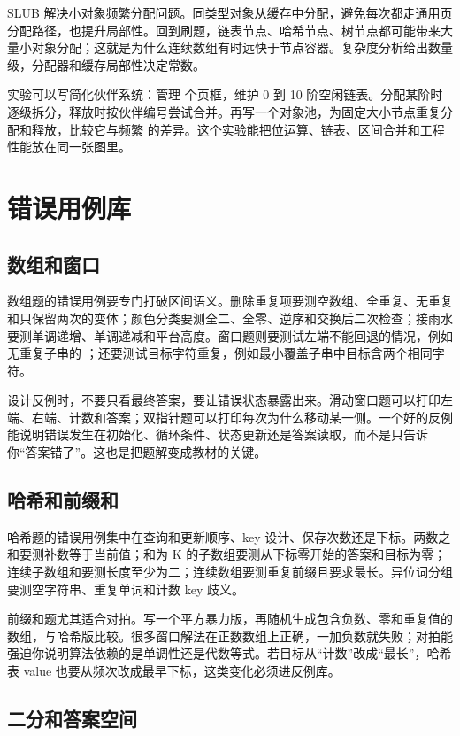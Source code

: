 SLUB 解决小对象频繁分配问题。同类型对象从缓存中分配，避免每次都走通用页分配路径，也提升局部性。回到刷题，链表节点、哈希节点、树节点都可能带来大量小对象分配；这就是为什么连续数组有时远快于节点容器。复杂度分析给出数量级，分配器和缓存局部性决定常数。

实验可以写简化伙伴系统：管理  个页框，维护 0 到 10 阶空闲链表。分配某阶时逐级拆分，释放时按伙伴编号尝试合并。再写一个对象池，为固定大小节点重复分配和释放，比较它与频繁  的差异。这个实验能把位运算、链表、区间合并和工程性能放在同一张图里。

\section{错误用例库}

\subsection{数组和窗口}

数组题的错误用例要专门打破区间语义。删除重复项要测空数组、全重复、无重复和只保留两次的变体；颜色分类要测全二、全零、逆序和交换后二次检查；接雨水要测单调递增、单调递减和平台高度。窗口题则要测试左端不能回退的情况，例如无重复子串的 ；还要测试目标字符重复，例如最小覆盖子串中目标含两个相同字符。

设计反例时，不要只看最终答案，要让错误状态暴露出来。滑动窗口题可以打印左端、右端、计数和答案；双指针题可以打印每次为什么移动某一侧。一个好的反例能说明错误发生在初始化、循环条件、状态更新还是答案读取，而不是只告诉你“答案错了”。这也是把题解变成教材的关键。

\subsection{哈希和前缀和}

哈希题的错误用例集中在查询和更新顺序、key 设计、保存次数还是下标。两数之和要测补数等于当前值；和为 K 的子数组要测从下标零开始的答案和目标为零；连续子数组和要测长度至少为二；连续数组要测重复前缀且要求最长。异位词分组要测空字符串、重复单词和计数 key 歧义。

前缀和题尤其适合对拍。写一个平方暴力版，再随机生成包含负数、零和重复值的数组，与哈希版比较。很多窗口解法在正数数组上正确，一加负数就失败；对拍能强迫你说明算法依赖的是单调性还是代数等式。若目标从“计数”改成“最长”，哈希表 value 也要从频次改成最早下标，这类变化必须进反例库。

\subsection{二分和答案空间}

